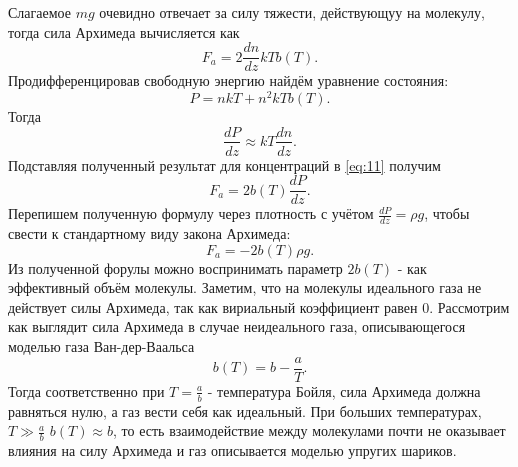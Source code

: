 \documentclass[12pt]{article}
\begin{document}
Слагаемое $mg$ очевидно отвечает за силу тяжести, действующуу на молекулу, тогда сила Архимеда вычисляется как 
\begin{equation}
    F_a = 2 \frac{dn}{dz} kT b(T).
    \label{eq:11}
\end{equation}
Продифференцировав свободную энергию найдём уравнение состояния: 
\begin{equation}
    P = nkT + n^2kTb(T).
    \label{eq:12}
\end{equation}
Тогда 
\[
    \frac{dP}{dz} \approx kT \frac{dn}{dz}.
\]
Подставляя полученный результат для концентраций в \ref{eq:11} получим 
\begin{equation}
    F_a = 2b(T) \frac{dP}{dz}.
    \label{eq:13}
\end{equation}
Перепишем полученную формулу через плотность с учётом $\frac{dP}{dz} = \rho g$, чтобы свести к стандартному виду закона Архимеда: 
\begin{equation}
    F_a = -2b(T)\rho g.
    \label{eq:14}
\end{equation}
Из полученной форулы можно воспринимать параметр $2b(T)$ - как эффективный объём молекулы. 
Заметим, что на молекулы идеального газа не действует силы Архимеда, так как вириальный коэффициент равен 0. 
Рассмотрим как выглядит сила Архимеда в случае неидеального газа, описывающегося 
моделью газа Ван-дер-Ваальса 
\begin{equation}
    b(T) = b - \frac{a}{T}.
    \label{eq:15}
\end{equation}
Тогда соответственно при $T = \frac{a}{b}$ - температура Бойля, сила Архимеда должна равняться нулю, а газ вести себя как идеальный. 
При больших температурах, $T \gg \frac{a}{b}$ $b(T) \approx b$, то есть взаимодействие между молекулами 
почти не оказывает влияния на силу Архимеда и газ описывается моделью упругих шариков.   
\end{document}
